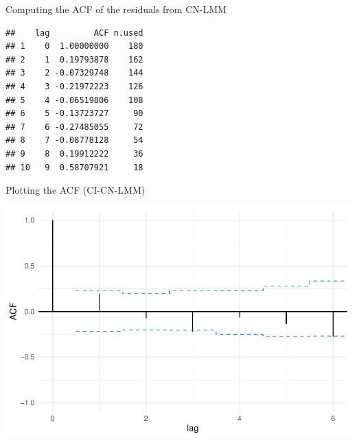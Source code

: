\begin{frame}[fragile]{Computing the ACF of the residuals from CN-LMM}
\protect\hypertarget{computing-the-acf-of-the-residuals-from-cn-lmm}{}

\begin{Shaded}
\begin{Highlighting}[]
\end{Highlighting}
\end{Shaded}

\begin{verbatim}
##    lag         ACF n.used
## 1    0  1.00000000    180
## 2    1  0.19793878    162
## 3    2 -0.07329748    144
## 4    3 -0.21972223    126
## 5    4 -0.06519806    108
## 6    5 -0.13723727     90
## 7    6 -0.27485055     72
## 8    7 -0.08778128     54
## 9    8  0.19912222     36
## 10   9  0.58707921     18
\end{verbatim}

\end{frame}

\begin{frame}[fragile]{Plotting the ACF (CI-CN-LMM)}
\protect\hypertarget{plotting-the-acf-ci-cn-lmm}{}

\begin{Shaded}
\begin{Highlighting}[]
\NormalTok{(} \NormalTok{))}
\end{Highlighting}
\end{Shaded}

\begin{center}\includegraphics[width=0.7\linewidth]{codes_files/figure-beamer/fit6-1} \end{center}

\end{frame}

